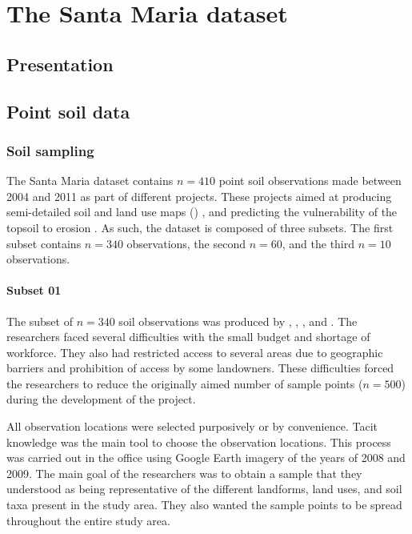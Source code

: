 \artigofalse
\chapter{The Santa Maria dataset}
\label{apen:database}

\tocless\section{Presentation}


\tocless\section{Point soil data}

\tocless\subsection{Soil sampling}

The Santa Maria dataset contains $n = 410$ point soil observations made between 2004 and 2011 as part of
different projects. These projects aimed at producing semi-detailed soil and land use maps ()
\cite{Pedron2005,Miguel2010,SamuelRosaEtAl2011a,MiguelEtAl2012}, and predicting the vulnerability of
the topsoil to erosion \cite{MouraBueno2012,Miguel2013}. As such, the dataset is composed of three
subsets. The first subset contains $n = 340$ observations, the second $n = 60$, and the third $n = 10$
observations.

\tocless\subsubsection{Subset 01}

The subset of $n = 340$ soil observations was produced by , 
, , and . The researchers 
faced several difficulties with the small budget and shortage of workforce. They also had restricted 
access to several areas due to geographic barriers and prohibition of access by some landowners.
These difficulties forced the researchers to reduce the originally aimed number of sample points 
($n = 500$) during the development of the project.

All observation locations were selected purposively or by convenience. Tacit knowledge was the main tool
to choose the observation locations. This process was carried out in the office using 
Google Earth\textregistered{} imagery of the years of 2008 and 2009. The main goal of the researchers was 
to obtain a sample that they
understood as being representative of the different landforms, land uses, and soil taxa present in the 
study area. They also wanted the sample points to be spread throughout the entire study area.

